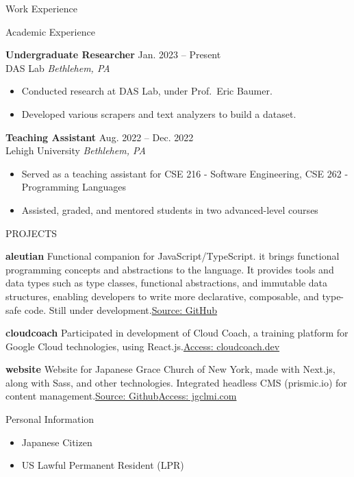 \documentclass{resume}
\begin{document}
\begin{rSection}{Work Experience}
\end{rSection} 

\begin{rSection}{Academic Experience}

    \textbf{Undergraduate Researcher} \hfill Jan. 2023 – Present\\
    DAS Lab \hfill \textit{Bethlehem, PA}
    \begin{itemize}
        \itemsep -5pt {} 
         \item Conducted research at DAS Lab, under Prof.\ Eric Baumer.
         \item Developed various scrapers and text analyzers to build a dataset.
     \end{itemize}
    
      \textbf{Teaching Assistant} \hfill Aug. 2022 – Dec. 2022\\
      Lehigh University \hfill \textit{Bethlehem, PA}
        \begin{itemize}
           \itemsep -5pt {}
            \item Served as a teaching assistant for CSE 216 - Software Engineering, CSE 262 - Programming Languages 
            \item Assisted, graded, and mentored students in two advanced-level courses
        \end{itemize}
    
    \end{rSection} 

    \begin{rSection}{PROJECTS}
        \vspace{-1.25em}
        \item \textbf{aleutian} {Functional companion for JavaScript/TypeScript. it brings functional programming concepts and abstractions to the language. It provides tools and data types such as type classes, functional abstractions, and immutable data structures, enabling developers to write more declarative, composable, and type-safe code. Still under development.\hspace{1em}\href{https://github.com/shunueda/aleutian}{Source: GitHub}}
        \item \textbf{cloudcoach} {Participated in development of Cloud Coach, a training platform for Google Cloud technologies, using React.js.\hspace{1em}\href{https://cloudcoach.dev}{Access: cloudcoach.dev}}
        \item \textbf{website} {
            Website for Japanese Grace Church of New York, made with Next.js, along with Sass, and other technologies. Integrated headless CMS (prismic.io) for content management.\hspace{1em}\href{https://github.com/MegumiChurch/website}{Source: Github}\hspace{1em}\href{https://www.jgclmi.com}{Access: jgclmi.com}
        }
        \end{rSection} 

\begin{rSection}{Personal Information} 
\begin{itemize}
    \item Japanese Citizen
    \item US Lawful Permanent Resident (LPR)
\end{itemize}
\end{rSection}
\end{document}
